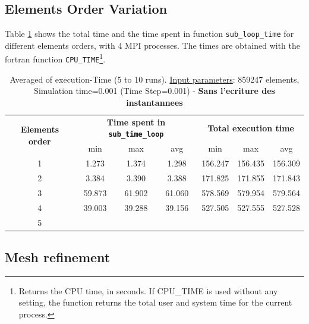 \documentclass[10pt,twoside]{article}   	%
\begin{document}
\subsection{Elements Order Variation}

Table \ref{tab:5} shows the total time and the time spent in function \texttt{sub\_loop\_time} for different elements orders, with 4 MPI processes. The times are obtained with the fortran function \texttt{CPU\_TIME}\footnote{Returns the CPU time, in seconds. If CPU\_TIME is used without any setting, the function returns the total user and system time for the current process.}. 


\begin{table}[ht!]
\centering
\caption{Averaged of execution-Time (5 to 10 runs). {\underline{Input parameters}}: 859247 elements,  Simulation time=0.001 (Time Step=0.001) - {\bf{Sans l'ecriture des instantannees}}}
{\small
\begin{tabular}{|c|c|c|c|c|c|c|} \hline 
\multirow{2}{*}{ {{\bf{Elements order}}} }	& \multicolumn{3}{c|}{ {{\bf{Time spent in \texttt{sub\_time\_loop}  }}} }	& \multicolumn{3}{c|}{  {{\bf{Total execution time}}} }\\ 
										&   		min & max & avg							& 	min & max & avg			\\ \hline \hline
 		1		                 				& 1.273 & 1.374 & 1.298								& 156.247  & 156.435 &  156.309	\\ \hline
 		2		                 				& 3.384	&  3.390  & 3.388							&  171.825 & 171.855 & 171.843		\\ \hline
 		3		                 				& 59.873 	 &  61.902	& 61.060							&  578.569 & 579.954 & 579.564 	\\ \hline
		 4		                 				& 39.003	& 39.288  & 39.156							& 527.505  & 527.555 & 527.528		\\ \hline
		5		                 				& 	&  &											&  	 & 	& 		\\ \hline
\end{tabular}
}
\label{tab:5}
\end{table}



\subsection{Mesh refinement}
\end{document}
